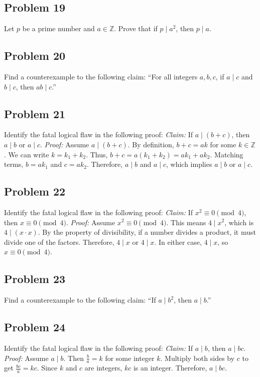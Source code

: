 \documentclass[12pt]{article}
\begin{document}
\subsection{Problem 19}
Let $p$ be a prime number and $a \in \mathbb{Z}$. Prove that if $p \mid a^2$, then $p \mid a$.

\subsection{Problem 20}
Find a counterexample to the following claim: ``For all integers $a, b, c$, if $a \mid c$ and $b \mid c$, then $ab \mid c$.''

\subsection{Problem 21}
Identify the fatal logical flaw in the following proof:
\textit{Claim:} If $a \mid (b+c)$, then $a \mid b$ or $a \mid c$.
\textit{Proof:} Assume $a \mid (b+c)$. By definition, $b+c = ak$ for some $k \in \mathbb{Z}$. We can write $k = k_1 + k_2$. Thus, $b+c = a(k_1 + k_2) = ak_1 + ak_2$. Matching terms, $b = ak_1$ and $c = ak_2$. Therefore, $a \mid b$ and $a \mid c$, which implies $a \mid b$ or $a \mid c$.

\subsection{Problem 22}
Identify the fatal logical flaw in the following proof:
\textit{Claim:} If $x^2 \equiv 0 \pmod 4$, then $x \equiv 0 \pmod 4$.
\textit{Proof:} Assume $x^2 \equiv 0 \pmod 4$. This means $4 \mid x^2$, which is $4 \mid (x \cdot x)$. By the property of divisibility, if a number divides a product, it must divide one of the factors. Therefore, $4 \mid x$ or $4 \mid x$. In either case, $4 \mid x$, so $x \equiv 0 \pmod 4$.

\subsection{Problem 23}
Find a counterexample to the following claim: ``If $a \mid b^2$, then $a \mid b$.''

\subsection{Problem 24}
Identify the fatal logical flaw in the following proof:
\textit{Claim:} If $a \mid b$, then $a \mid bc$.
\textit{Proof:} Assume $a \mid b$. Then $\frac{b}{a} = k$ for some integer $k$. Multiply both sides by $c$ to get $\frac{bc}{a} = kc$. Since $k$ and $c$ are integers, $kc$ is an integer. Therefore, $a \mid bc$.
\end{document}
